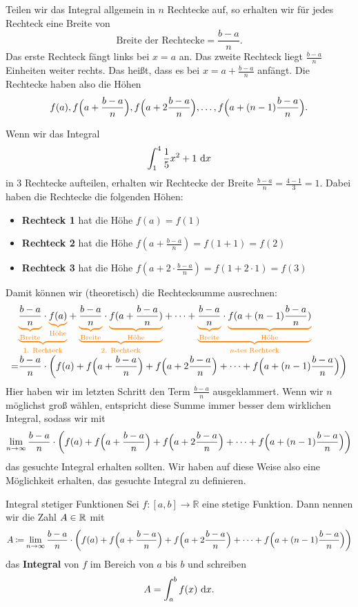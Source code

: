\documentclass[../../main.tex]{subfiles}
\begin{document}
Teilen wir das Integral allgemein in $n$ Rechtecke auf, so erhalten wir für jedes Rechteck eine Breite von
\[\text{Breite der Rechtecke}=\frac{b-a}{n}.\]
Das erste Rechteck fängt links bei $x=a$ an. Das zweite Rechteck liegt $\frac{b-a}{n}$ Einheiten weiter rechts. Das
heißt, dass es bei $x=a+\frac{b-a}{n}$ anfängt. Die Rechtecke haben also die Höhen
\[f(a), f\Bigl(a+\frac{b-a}{n}\Bigr), f\Bigl(a+2\frac{b-a}{n}\Bigr),\dots,f\Bigl(a+(n-1)\frac{b-a}{n}\Bigr).\]
\begin{example}{}
    Wenn wir das Integral
    \[\int_1^4\frac{1}{5}x^2+1\mathop{}\mathrm{d} x\]
    in 3 Rechtecke aufteilen, erhalten wir Rechtecke der Breite $\frac{b-a}{n}=\frac{4-1}{3}=1$. Dabei haben die
    Rechtecke die folgenden Höhen:
    \begin{itemize}
        \item \textbf{Rechteck 1} hat die Höhe $f(a)=f(1)$
        \item \textbf{Rechteck 2} hat die Höhe $f(a+\frac{b-a}{n})=f(1+1)=f(2)$
        \item \textbf{Rechteck 3} hat die Höhe $f(a+2\cdot\frac{b-a}{n})=f(1+2\cdot 1)=f(3)$
    \end{itemize}
\end{example}

Damit können wir (theoretisch) die Rechtecksumme ausrechnen:
\begin{align*}
    &\colorbrace{\colorbrace{\frac{b-a}{n}}{\text{Breite}}\cdot \colorbrace{f(a)}{\text{Höhe}}}{\text{1. Rechteck}}+
    \colorbrace{\colorbrace{\frac{b-a}{n}}{\text{Breite}}\cdot \colorbrace{f(a+\frac{b-a}{n})}{\text{Höhe}}}{\text{2. Rechteck}}+
    \dots+
    \colorbrace{\colorbrace{\frac{b-a}{n}}{\text{Breite}}\cdot \colorbrace{f(a+(n-1)\frac{b-a}{n})}{\text{Höhe}}}{n\text{-tes Rechteck}}\\
    =&\frac{b-a}{n}\cdot \biggl(f(a)+f\Bigl(a+\frac{b-a}{n}\Bigr)+f\Bigl(a+2\frac{b-a}{n}\Bigr)+\dots+f\Bigl(a+(n-1)\frac{b-a}{n}\Bigr)\biggr)
\end{align*}
Hier haben wir im letzten Schritt den Term $\frac{b-a}{n}$ ausgeklammert. Wenn wir $n$ möglichst groß wählen, entspricht diese Summe immer 
besser dem wirklichen Integral, sodass wir mit
\[\lim_{n\rightarrow\infty}\frac{b-a}{n}\cdot \biggl(f(a)+f\Bigl(a+\frac{b-a}{n}\Bigr)+f\Bigl(a+2\frac{b-a}{n}\Bigr)+\dots+f\Bigl(a+(n-1)\frac{b-a}{n}\Bigr)\biggr)\]
das gesuchte Integral erhalten sollten. Wir haben auf diese Weise also eine Möglichkeit erhalten, das gesuchte Integral
zu definieren.

\begin{definition}{Integral stetiger Funktionen}
    Sei $f:[a,b]\rightarrow\mathbb{R}$ eine stetige Funktion. Dann nennen wir die Zahl $A\in\mathbb{R}$ mit
    \[A\mathbin{\coloneqq} \lim_{n\rightarrow\infty}\frac{b-a}{n}\cdot \biggl(f(a)+f\Bigl(a+\frac{b-a}{n}\Bigr)+f\Bigl(a+2\frac{b-a}{n}\Bigr)+\dots+f\Bigl(a+(n-1)\frac{b-a}{n}\Bigr)\biggr)\]
    das \textbf{Integral} von $f$ im Bereich von $a$ bis $b$ und schreiben
    \[A=\int_a^bf(x)\mathop{}\mathrm{d} x.\]
\end{definition}
\end{document}
